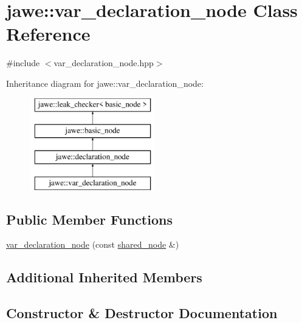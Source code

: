 \hypertarget{classjawe_1_1var__declaration__node}{}\section{jawe\+:\+:var\+\_\+declaration\+\_\+node Class Reference}
\label{classjawe_1_1var__declaration__node}


{\ttfamily \#include $<$var\+\_\+declaration\+\_\+node.\+hpp$>$}

Inheritance diagram for jawe\+:\+:var\+\_\+declaration\+\_\+node\+:\begin{figure}[H]
\begin{center}
\leavevmode
\includegraphics[height=4.000000cm]{classjawe_1_1var__declaration__node}
\end{center}
\end{figure}
\subsection*{Public Member Functions}
\begin{DoxyCompactItemize}
\item 
\hyperlink{classjawe_1_1var__declaration__node_aedaf24be78ce62b22988d873e0c855cf}{var\+\_\+declaration\+\_\+node} (const \hyperlink{namespacejawe_a3f307481d921b6cbb50cc8511fc2b544}{shared\+\_\+node} \&)
\end{DoxyCompactItemize}
\subsection*{Additional Inherited Members}


\subsection{Constructor \& Destructor Documentation}
\mbox{\label{classjawe_1_1var__declaration__node_aedaf24be78ce62b22988d873e0c855cf}} 
